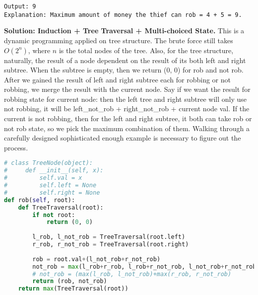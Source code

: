 \documentclass[../main.tex]{subfiles}
\begin{document}
\begin{examples}
\begin{lstlisting}[numbers=none]
Output: 9
Explanation: Maximum amount of money the thief can rob = 4 + 5 = 9.
\end{lstlisting}
\textbf{Solution: Induction + Tree Traversal + Multi-choiced State.} This is a dynamic programming applied on tree structure. The brute force still takes $O(2^n)$, where $n$ is the total nodes of the tree. Also, for the tree structure, naturally, the result of a node dependent on the result of its both left and right subtree. When the subtree is empty, then we return (0, 0) for rob and not rob. After we gained the result of left and right subtree each for robbing or not robbing, we merge the result with the current node. Say if we want the result for robbing state for current node: then the left tree and right subtree will only use not robbing, it will be left\_not\_rob + right\_not\_rob + current node val. If the current is not robbing, then for the left and right subtree, it both can take rob or not rob state, so we pick the maximum combination of them.  Walking through a carefully designed sophisticated enough example is necessary to figure out the process.
\begin{lstlisting}[language=Python]
# class TreeNode(object):
#     def __init__(self, x):
#         self.val = x
#         self.left = None
#         self.right = None
def rob(self, root):
    def TreeTraversal(root):
        if not root:
            return (0, 0)
        
        l_rob, l_not_rob = TreeTraversal(root.left)
        r_rob, r_not_rob = TreeTraversal(root.right)
        
        rob = root.val+(l_not_rob+r_not_rob)
        not_rob = max(l_rob+r_rob, l_rob+r_not_rob, l_not_rob+r_not_rob, l_not_rob+r_rob)
        # not_rob = (max(l_rob, l_not_rob)+max(r_rob, r_not_rob)
        return (rob, not_rob)
    return max(TreeTraversal(root))
\end{lstlisting}

\end{examples}



\end{document}
